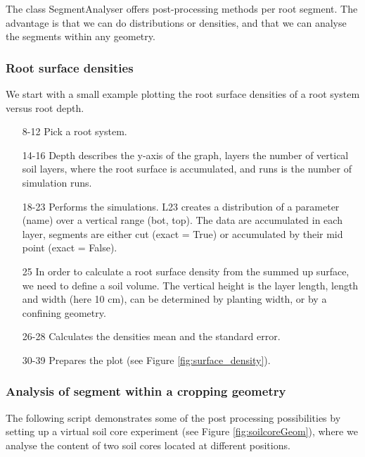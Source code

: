 The class SegmentAnalyser offers post-processing methods per root segment. The advantage is that we can do distributions or densities, and that we can analyse the segments within any geometry. 

\subsubsection*{Root surface densities}

We start with a small example plotting the root surface densities of a root system versus root depth.



\begin{itemize}
\item[8-12] Pick a root system.
\item[14-16] Depth describes the y-axis of the graph, layers the number of vertical soil layers, where the root surface is accumulated, and runs is the number of simulation runs. 
\item[18-23] Performs the simulations. L23 creates a distribution of a parameter (name) over a vertical range (bot, top). The data are accumulated in each layer, segments are either cut (exact = True) or accumulated by their mid point (exact = False). 
\item[25] In order to calculate a root surface density from the summed up surface, we need to define a soil volume. The vertical height is the layer length, length and width (here 10 cm), can be determined by planting width, or by a confining geometry. 
\item[26-28] Calculates the densities mean and the standard error. 
\item[30-39] Prepares the plot (see Figure \ref{fig:surface_density}).
\end{itemize}



\subsubsection*{Analysis of segment within a cropping geometry}

The following script demonstrates some of the post processing possibilities by setting up a virtual soil core experiment (see Figure \ref{fig:soilcoreGeom}), where we analyse the content of two soil cores located at different positions.

